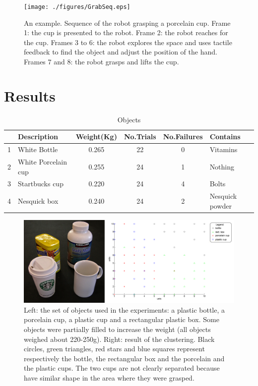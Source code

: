 \begin{figure}[tb]
\centerline{
\texttt{[image: ./figures/GrabSeq.eps]}
} \caption{An example. Sequence of the robot grasping a porcelain
cup. Frame 1: the cup is presented to the robot. Frame 2: the
robot reaches for the cup. Frames 3 to 6:  the robot explores the
space and uses tactile feedback to find the object and adjust the
position of the hand. Frames 7 and 8: the robot grasps
and lifts the cup.} \label{fig:sequence}
\end{figure}

\section{Results}
\label{sec:results}

\begin{table}[htb]
  \caption{Objects} \label{tab:objects} \centering
  \begin{tabular}{|c|l|c|c|c|l|}
    \hline
    &Description& Weight(Kg)&No.Trials&No.Failures&Contains \\
    \hline
    1&White Bottle        & 0.265 & 22& 0 & Vitamins\\
    2&White Porcelain cup & 0.255 & 24& 1 & Nothing\\
    3&Startbucks cup      & 0.220 & 24& 4 & Bolts \\
    4&Nesquick box        & 0.240 & 24& 2 & Nesquick powder\\

    \hline
  \end{tabular}
\end{table}

\begin{figure}[tbp]
\centerline{
\includegraphics[width=6.0in]{./figures/objects-clusters2.eps}
}\caption{Left: the set of objects used in the experiments: a plastic bottle,
a porcelain cup, a plastic cup and a rectangular plastic box. Some objects were
partially filled to increase the weight (all objects weighed about 220-250g).
Right: result of the clustering. Black circles, green
triangles, red stars and blue squares represent respectively the bottle,
the rectangular box and the porcelain and the plastic cups. The two cups are not
clearly separated because have similar shape in the area where they were grasped.}
\label{fig:Objects}
\end{figure}

